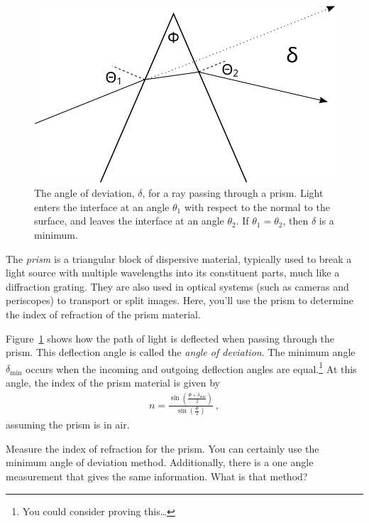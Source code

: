 \documentclass[12pt]{article}
\begin{document}
\begin{figure}
  \centering
  \includegraphics[width=\textwidth/2]{figures/prism}
  \caption{The angle of deviation, $\delta$, for a ray passing through
    a prism.  Light enters the interface at an angle $\theta_1$ with
    respect to the normal to the surface, and leaves the interface at
    an angle $\theta_2$.  If $\theta_1 = \theta_2$, then $\delta$ is a
    minimum.}
  \label{fig:prism}
\end{figure}

The \textit{prism} is a triangular block of dispersive material,
typically used to break a light source with multiple wavelengths into
its constituent parts, much like a diffraction grating.  They are also
used in optical systems (such as cameras and periscopes) to transport
or split images.  Here, you'll use the prism to determine the index of
refraction of the prism material.

Figure~\ref{fig:prism} shows how the path of light is deflected when
passing through the prism.  This deflection angle is called the
\textit{angle of deviation}.  The minimum angle $\delta_\mathrm{min}$
occurs when the incoming and outgoing deflection angles are
equal.\footnote{You could consider proving this\ldots} At this angle,
the index of the prism material is given by
\begin{gather*}
  n = \frac{\sin\left(\frac{\Phi+\delta_\mathrm{min}}{2}\right)}
  {\sin\left(\frac{\Phi}{2}\right)}\ ,
\end{gather*}
assuming the prism is in air.

Measure the index of refraction for the prism.  You can certainly use
the minimum angle of deviation method.  Additionally, there is a one
angle measurement that gives the same information.  What is that
method?
\end{document}
